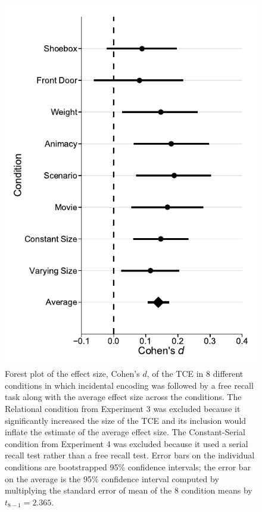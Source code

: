 \documentclass[man,natbib,floatsintext]{apa6} %
\begin{document}
\begin{figure}%
\includegraphics{figures/meta.pdf}
\caption{Forest plot of the effect size, Cohen's $d$, of the TCE in 8 different conditions in which incidental encoding was followed by a free recall task along with the average effect size across the conditions. The Relational condition from Experiment 3 was excluded because it significantly increased the size of the TCE and its inclusion would inflate the estimate of the average effect size. The Constant-Serial condition from Experiment 4 was excluded because it used a serial recall test rather than a free recall test. Error bars on the individual conditions are bootstrapped 95\% confidence intervals; the error bar on the average is the 95\% confidence interval computed by multiplying the standard error of mean of the 8 condition means by $t_{8-1}=2.365$.}
\label{meta}
\end{figure}
\end{document}
